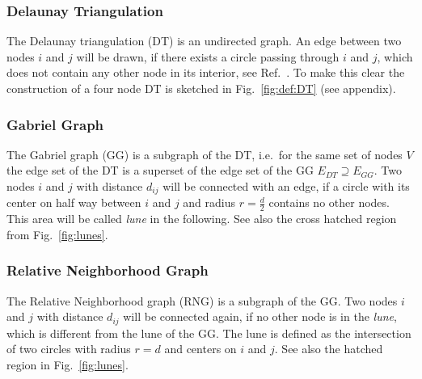     \subsubsection{Delaunay Triangulation}
        The Delaunay triangulation (DT) is an undirected graph. An edge
        between two nodes \(i\) and \(j\) will be drawn, if there exists
        a circle passing through \(i\) and \(j\), which does not contain
        any other node in its interior, see Ref.\ \cite{Katajainen}.
        To make this clear the construction of a four node DT is sketched
        in Fig.\ \ref{fig:def:DT} (see appendix).

    \subsubsection{Gabriel Graph}
        The Gabriel graph (GG) \cite{Gabriel1969}
        is a subgraph of the DT, i.e.\ for the same set of nodes
        \(V\) the edge set of the DT is a superset of the edge set of the
        GG \(E_{DT} \supseteq E_{GG}\). Two nodes \(i\) and \(j\) with distance
        \(d_{ij}\) will be connected with an edge, if a circle with its
        center on half way between \(i\) and \(j\) and radius
        \(r = \frac d 2\) contains no other nodes. This area will be
        called \emph{lune} in the following. See also the cross hatched region
        from Fig.\ \ref{fig:lunes}.

    \subsubsection{Relative Neighborhood Graph}
        The Relative Neighborhood
        graph (RNG) \cite{Toussaint1980} is a subgraph of the GG. Two nodes \(i\) and \(j\) with
        distance \(d_{ij}\) will be connected again, if no other node is in the
        \emph{lune}, which is different from the lune of the GG. The lune
        is defined as the intersection of two
        circles with radius \(r = d\) and centers on \(i\) and \(j\).
        See also the hatched region in Fig.\ \ref{fig:lunes}.

